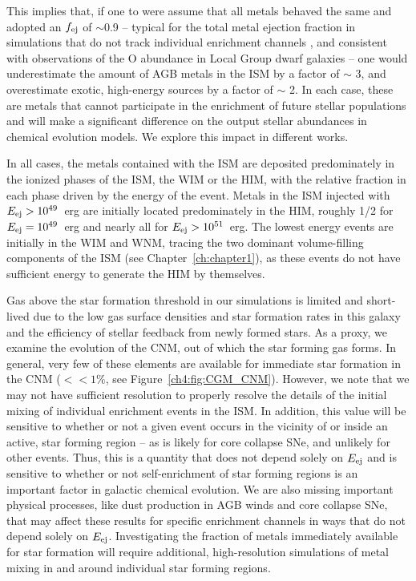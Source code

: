 This implies that, if one to were assume that all metals behaved the same and adopted an $f_{\rm ej}$ of $\sim$0.9 -- typical for the total metal ejection fraction in simulations that do not track individual enrichment channels \citep[e.g.][]{Muratov2017,Christensen2018}, and consistent with observations of the O abundance in Local Group dwarf galaxies \citep[e.g.][]{Kirby2011,McQuinn2015} -- one would underestimate the amount of AGB metals in the ISM by a factor of $\sim$ 3, and overestimate exotic, high-energy sources by a factor of $\sim$ 2. In each case, these are metals that cannot participate in the enrichment of future stellar populations and will make a significant difference on the output stellar abundances in chemical evolution models. We explore this impact in different works.

In all cases, the metals contained with the ISM are deposited predominately in the ionized phases of the ISM, the WIM or the HIM, with the relative fraction in each phase driven by the energy of the event. Metals in the ISM injected with $E_{\rm ej} > 10^{49}$~erg are initially located predominately in the HIM, roughly 1/2 for $E_{\rm ej} = 10^{49}$~erg and nearly all for $E_{\rm ej} > 10^{51}$~erg. The lowest energy events are initially in the WIM and WNM, tracing the two dominant volume-filling components of the ISM (see Chapter~\ref{ch:chapter1}), as these events do not have sufficient energy to generate the HIM by themselves.

Gas above the star formation threshold in our simulations is limited and short-lived due to the low gas surface densities and star formation rates in this galaxy and the efficiency of stellar feedback from newly formed stars. As a proxy, we examine the evolution of the CNM, out of which the star forming gas forms. In general, very few of these elements are available for immediate star formation in the CNM ($<< 1\%$, see Figure~\ref{ch4:fig:CGM_CNM}). However, we note that we may not have sufficient resolution to properly resolve the details of the initial mixing of individual enrichment events in the ISM. In addition, this value will be sensitive to whether or not a given event occurs in the vicinity of or inside an active, star forming region -- as is likely for core collapse SNe, and unlikely for other events. Thus, this is a quantity that does not depend solely on $E_{\rm ej}$ and is sensitive to whether or not self-enrichment of star forming regions is an important factor in galactic chemical evolution. We are also missing important physical processes, like dust production in AGB winds and core collapse SNe, that may affect these results for specific enrichment channels in ways that do not depend solely on $E_{\rm ej}$. Investigating the fraction of metals immediately available for star formation will require additional, high-resolution simulations of metal mixing in and around individual star forming regions.

